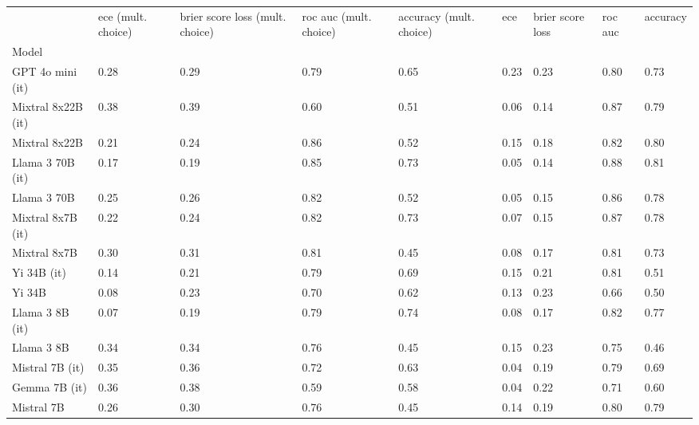 \begin{tabular}{lllllllll}
\toprule
 & ece (mult. choice) & brier score loss (mult. choice) & roc auc (mult. choice) & accuracy (mult. choice) & ece & brier score loss & roc auc & accuracy \\
Model &  &  &  &  &  &  &  &  \\
\midrule
GPT 4o mini (it) & 0.28 & 0.29 & 0.79 & 0.65 & 0.23 & 0.23 & 0.80 & 0.73 \\
Mixtral 8x22B (it) & \cellcolor{orange!23.0} 0.38 & \cellcolor{orange!8.0} 0.39 & 0.60 & 0.51 & 0.06 & \cellcolor{cyan!21.9} 0.14 & \cellcolor{cyan!24.4} 0.87 & \cellcolor{cyan!16.5} 0.79 \\
Mixtral 8x22B & 0.21 & 0.24 & \cellcolor{cyan!25.0} 0.86 & 0.52 & 0.15 & 0.18 & 0.82 & \cellcolor{cyan!20.7} 0.80 \\
Llama 3 70B (it) & 0.17 & \cellcolor{cyan!17.1} 0.19 & \cellcolor{cyan!23.3} 0.85 & \cellcolor{cyan!15.4} 0.73 & \cellcolor{cyan!0.7} 0.05 & \cellcolor{cyan!25.0} 0.14 & \cellcolor{cyan!25.0} 0.88 & \cellcolor{cyan!25.0} 0.81 \\
Llama 3 70B & 0.25 & 0.26 & \cellcolor{cyan!2.3} 0.82 & 0.52 & 0.05 & \cellcolor{cyan!16.7} 0.15 & \cellcolor{cyan!13.6} 0.86 & \cellcolor{cyan!5.8} 0.78 \\
Mixtral 8x7B (it) & 0.22 & 0.24 & \cellcolor{cyan!6.8} 0.82 & \cellcolor{cyan!13.7} 0.73 & 0.07 & \cellcolor{cyan!16.7} 0.15 & \cellcolor{cyan!23.2} 0.87 & \cellcolor{cyan!7.2} 0.78 \\
Mixtral 8x7B & 0.30 & 0.31 & \cellcolor{cyan!1.1} 0.81 & \cellcolor{orange!24.1} 0.45 & 0.08 & 0.17 & 0.81 & 0.73 \\
Yi 34B (it) & 0.14 & 0.21 & 0.79 & 0.69 & 0.15 & 0.21 & 0.81 & 0.51 \\
Yi 34B & 0.08 & 0.23 & 0.70 & 0.62 & 0.13 & 0.23 & 0.66 & 0.50 \\
Llama 3 8B (it) & 0.07 & \cellcolor{cyan!25.0} 0.19 & 0.79 & \cellcolor{cyan!25.0} 0.74 & 0.08 & 0.17 & 0.82 & 0.77 \\
Llama 3 8B & 0.34 & 0.34 & 0.76 & \cellcolor{orange!25.0} 0.45 & 0.15 & 0.23 & 0.75 & \cellcolor{orange!25.0} 0.46 \\
Mistral 7B (it) & \cellcolor{orange!6.6} 0.35 & 0.36 & 0.72 & 0.63 & \cellcolor{cyan!7.4} 0.04 & 0.19 & 0.79 & 0.69 \\
Gemma 7B (it) & \cellcolor{orange!10.0} 0.36 & 0.38 & 0.59 & 0.58 & \cellcolor{cyan!8.8} 0.04 & 0.22 & 0.71 & 0.60 \\
Mistral 7B & 0.26 & 0.30 & 0.76 & \cellcolor{orange!25.0} 0.45 & 0.14 & 0.19 & 0.80 & \cellcolor{cyan!12.9} 0.79 \\

\end{tabular}
